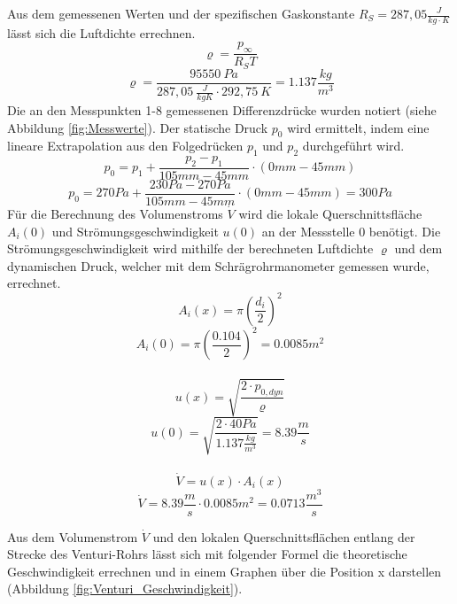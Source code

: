 \documentclass[pdfpaper,openbib, twoside, titlepage, halfparskip-,a4paper, 10pt]{scrarticle}
\begin{document}
Aus dem gemessenen Werten und der spezifischen Gaskonstante $R_S=287,05 \frac{J}{kg \cdot K}$ lässt sich die Luftdichte errechnen.
\begin{equation}
    \varrho = \frac{p_\infty}{R_S T}
\end{equation}
\begin{equation*}
    \varrho = \frac{95550 \ Pa}{287,05 \ \frac{J}{kgK} \cdot 292,75 \ K}=1.137 \frac{kg}{m^3}
\end{equation*}
Die an den Messpunkten 1-8 gemessenen Differenzdrücke wurden notiert (siehe Abbildung \ref{fig:Messwerte}). Der statische Druck $p_0$ wird ermittelt, indem eine lineare Extrapolation aus den Folgedrücken $p_1$ und $p_2$ durchgeführt wird.
\begin{equation}
    p_0=p_1+\frac{p_2-p_1}{105mm-45mm}\cdot (0mm-45mm)
\end{equation}
\begin{equation*}
    p_0=270Pa+\frac{230Pa-270Pa}{105mm-45mm}\cdot (0mm-45mm)= 300Pa
\end{equation*}
Für die Berechnung des Volumenstroms $\dot{V}$ wird die lokale Querschnittsfläche $A_i(0)$ und Strömungsgeschwindigkeit $u(0)$ an der Messstelle 0 benötigt. Die Strömungsgeschwindigkeit wird mithilfe der berechneten Luftdichte $\varrho$ und dem dynamischen Druck, welcher mit dem Schrägrohrmanometer gemessen wurde, errechnet.
\begin{equation}
    A_i(x) = \pi \left( \frac{d_i}{2} \right)^2 
\end{equation}
\begin{equation*}
    A_i(0) = \pi \left( \frac{0.104}{2} \right)^2 = 0.0085m^2
\end{equation*}
\\ 
\begin{equation}
    u(x)= \sqrt{\frac{2 \cdot p_{0,dyn}}{\varrho}}
\end{equation}
\begin{equation*}
    u(0)= \sqrt{\frac{2 \cdot 40Pa}{1.137 \frac{kg}{m^3}}}=8.39 \frac{m}{s}
\end{equation*}
\\ 
\begin{equation}
    \dot{V}=u(x) \cdot A_i(x) 
\end{equation}
\begin{equation*}
    \dot{V}= 8.39 \frac{m}{s} \cdot 0.0085m^2 = 0.0713 \frac{m^3}{s}
\end{equation*}

Aus dem Volumenstrom $\dot{V}$ und den lokalen Querschnittsflächen entlang der Strecke des Venturi-Rohrs lässt sich mit folgender Formel die theoretische Geschwindigkeit errechnen und in einem Graphen über die Position x darstellen (Abbildung \ref{fig:Venturi_Geschwindigkeit}).
\end{document}
